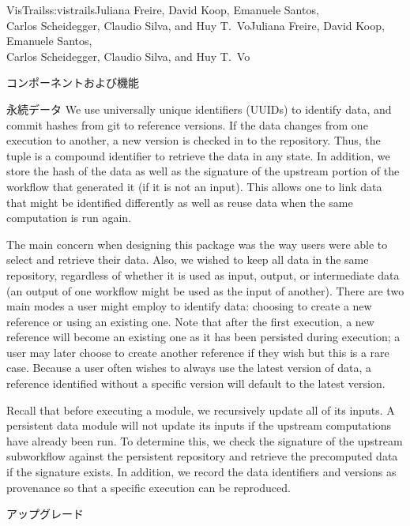 \begin{aosachaptertoc}{VisTrails}{s:vistrails}{Juliana Freire, David Koop, Emanuele Santos, \\ Carlos Scheidegger, Claudio Silva, and Huy T.\ Vo}{Juliana Freire, David Koop, Emanuele Santos, \\ \hspace*{0.9cm} Carlos Scheidegger, Claudio Silva, and Huy T.\ Vo}
\begin{aosasect1}{コンポーネントおよび機能}
\begin{aosasect2}{永続データ}
We use universally unique identifiers (UUIDs) to identify data, and
commit hashes from git to reference versions.  If the data changes
from one execution to another, a new version is checked in to the
repository.  Thus, the  tuple is a compound identifier
to retrieve the data in any state.  In addition, we store the hash of
the data as well as the signature of the upstream portion of the
workflow that generated it (if it is not an input).  This allows one
to link data that might be identified differently as well as reuse
data when the same computation is run again.

The main concern when designing this package was the way users were
able to select and retrieve their data.  Also, we wished to keep all
data in the same repository, regardless of whether it is used as
input, output, or intermediate data (an output of one workflow might
be used as the input of another).  There are two main modes a user
might employ to identify data: choosing to create a new reference or
using an existing one.  Note that after the first execution, a new
reference will become an existing one as it has been persisted during
execution; a user may later choose to create another reference if
they wish but this is a rare case.  Because a user often wishes to
always use the latest version of data, a reference identified without
a specific version will default to the latest version.

Recall that before executing a module, we recursively update all of
its inputs.  A persistent data module will not update its inputs if
the upstream computations have already been run.  To determine this,
we check the signature of the upstream subworkflow against the
persistent repository and retrieve the precomputed data if the
signature exists.  In addition, we record the data identifiers and
versions as provenance so that a specific execution can be reproduced.

\end{aosasect2}

\begin{aosasect2}{アップグレード}
\label{sec.vistrails.upgrades}


\end{aosasect2}
\end{aosasect1}
\end{aosachaptertoc}
